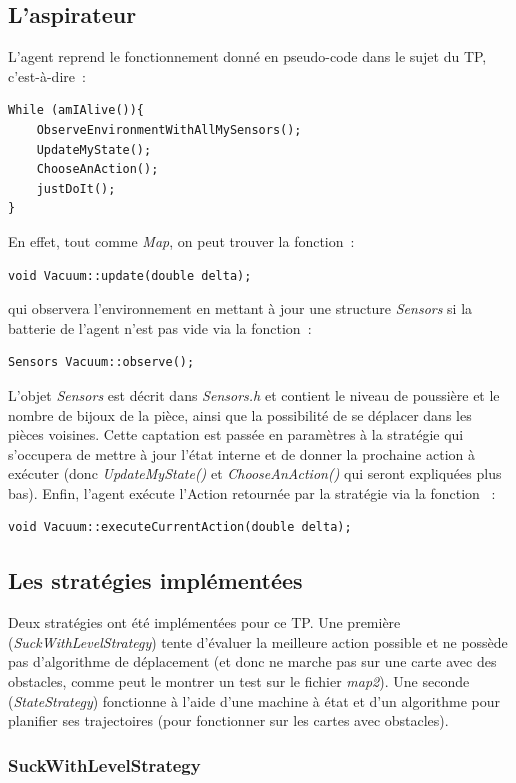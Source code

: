 \documentclass{article}
\begin{document}
\subsection{L'aspirateur}
L'agent reprend le fonctionnement donné en pseudo-code dans le sujet du TP, c'est-à-dire~:
\begin{verbatim}
While (amIAlive()){
    ObserveEnvironmentWithAllMySensors();
    UpdateMyState();
    ChooseAnAction();
    justDoIt();
}
\end{verbatim}
En effet, tout comme \emph{Map}, on peut trouver la fonction~:
\begin{verbatim}
void Vacuum::update(double delta);
\end{verbatim}
qui observera l'environnement en mettant à jour une structure \emph{Sensors} si la batterie de l'agent n'est pas vide via la fonction~:
\begin{verbatim}
Sensors Vacuum::observe();
\end{verbatim}
L'objet \emph{Sensors} est décrit dans \emph{Sensors.h} et contient le niveau de poussière et le nombre de bijoux de la pièce, ainsi que la possibilité de se déplacer dans les pièces voisines. Cette captation est passée en paramètres à la stratégie qui s'occupera de mettre à jour l'état interne et de donner la prochaine action à exécuter (donc \emph{UpdateMyState()} et \emph{ChooseAnAction()} qui seront expliquées plus bas). Enfin, l'agent exécute l'Action retournée par la stratégie via la fonction ~:
\begin{verbatim}
void Vacuum::executeCurrentAction(double delta);
\end{verbatim}
\subsection{Les stratégies implémentées}

Deux stratégies ont été implémentées pour ce TP. Une première (\emph{SuckWithLevelStrategy}) tente d'évaluer la meilleure action possible et ne possède pas d'algorithme de déplacement (et donc ne marche pas sur une carte avec des obstacles, comme peut le montrer un test sur le fichier \emph{map2}). Une seconde (\emph{StateStrategy}) fonctionne à l'aide d'une machine à état et d'un algorithme pour planifier ses trajectoires (pour fonctionner sur les cartes avec obstacles).

\subsubsection{SuckWithLevelStrategy}
\end{document}
